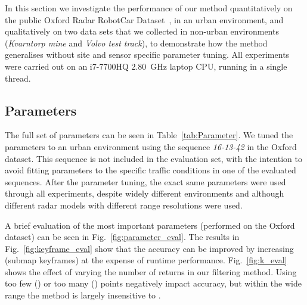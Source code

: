 In this section we investigate the performance of our method quantitatively on the public Oxford Radar RobotCar Dataset~\cite{RadarRobotCarDatasetICRA2020}, in an urban environment, and qualitatively on two data sets that we collected in non-urban environments (\textit{Kvarntorp mine} and \textit{Volvo test track}), to demonstrate how the method generalises without site and sensor specific parameter tuning. All experiments were carried out on an i7-7700HQ 2.80~GHz laptop CPU, running in a single thread.





\subsection{Parameters}
\label{ssec:Parameters}
The full set of parameters can be seen in Table~\ref{tab:Parameter}. We tuned the parameters to an urban environment using the sequence \textit{16-13-42} in the Oxford dataset. This sequence is not included in the evaluation set, with the intention to avoid fitting parameters to the specific traffic conditions in one of the evaluated sequences. After the parameter tuning, the exact same parameters were used through all experiments, despite widely different environments and although different radar models with different range resolutions were used.

A brief evaluation of the most important parameters (performed on the Oxford dataset) can be seen in Fig.~\ref{fig:parameter_eval}. 
The results in Fig.~\ref{fig:keyframe_eval} show that the accuracy can be improved by increasing  (submap keyframes) at the expense of runtime performance. 
Fig.~\ref{fig:k_eval} shows the effect of varying the number  of returns in our filtering method.
Using too few () or too many () points negatively impact accuracy, but within the wide range  the method is largely insensitive to .

